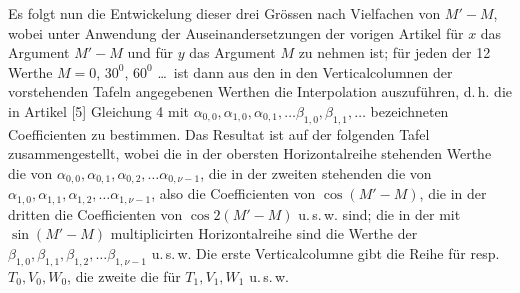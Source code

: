 \begin{landscape}
\begingroup
\fontsize{10}{13}\selectfont
{}
\renewcommand{\headrulewidth}{0pt}
Es folgt nun die Entwickelung dieser drei Grössen nach Vielfachen von \(M'-M\), wobei unter
Anwendung der Auseinandersetzungen der vorigen Artikel für \(x\) das Argument \(M'-M\) und für \(y\)
das Argument \(M\) zu nehmen ist; für jeden der 12 Werthe \(M=0\), \(30^0\), \(60^0\) \dots\ ist dann
aus den in den Verticalcolumnen der vorstehenden Tafeln angegebenen Werthen die Interpolation
auszuführen, d.\,h. die in Artikel [5] Gleichung 4 mit \(\alpha_{0,0}, \alpha_{1,0}, \alpha_{0,1},
\dots \beta_{1,0}, \beta_{1,1}, \dots\) bezeichneten Coefficienten zu bestimmen. Das Resultat
ist auf der folgenden Tafel zusammengestellt, wobei die in der obersten Horizontalreihe
stehenden Werthe die von \(\alpha_{0,0}, \alpha_{0,1}, \alpha_{0,2}, \dots \alpha_{0,\nu-1}\),
die in der zweiten stehenden die von \(\alpha_{1,0}, \alpha_{1,1}, \alpha_{1,2}, \dots
\alpha_{1,\nu-1}\), also die Coefficienten von \(\cos(M'-M)\), die in der dritten die
Coefficienten von \(\cos 2(M'-M)\) u.\,s.\,w. sind; die in der mit \(\sin(M'-M)\) multiplicirten
Horizontalreihe sind die Werthe der \(\beta_{1,0}, \beta_{1,1}, \beta_{1,2}, \dots
\beta_{1,\nu-1}\) u.\,s.\,w. Die erste Verticalcolumne gibt die Reihe für resp. \(T_0, V_0, W_0\),
die zweite die für \(T_1, V_1, W_1\) u.\,s.\,w.


\end{landscape}
